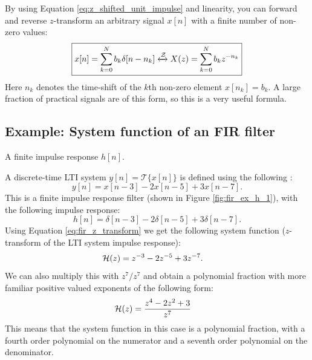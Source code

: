 By using Equation \ref{eq:z_shifted_unit_impulse} and linearity, you
can forward and reverse $z$-transform an arbitrary signal $x[n]$ with a
finite number of non-zero values:
\begin{equation}
  \boxed{
    x[n] = \sum_{k=0}^{N}  b_k \delta[n-n_k] \xleftrightarrow{\mathcal{Z}} X(z) = \sum_{k=0}^{N}  b_k z^{-n_k}
    \label{eq:fir_z_transform}
    }
\end{equation}
Here $n_k$ denotes the time-shift of the $k$th non-zero element
$x[n_k]=b_k$. A large fraction of practical signals are of this form, so this is a very useful formula.

\subsection{Example: System function of an FIR filter}

\begin{marginfigure}
\begin{center}
\end{center}
\caption{A finite impulse response $h[n]$.}
\label{fig:fir_ex_h_1}
\end{marginfigure}

A discrete-time LTI system $y[n]=\mathcal{T}\{x[n]\}$ is defined using the following \emph{}:
\begin{equation}
y[n] = x[n-3] - 2 x[n-5] + 3 x[n-7].
\end{equation}
This is a finite impulse response filter (shown in Figure \ref{fig:fir_ex_h_1}), with the following impulse response:
\begin{equation}
h[n]=\delta[n-3]-2\delta[n-5]+3\delta[n-7].
\end{equation}
Using Equation \ref{eq:fir_z_transform} we get the following system function ($z$-transform of the LTI system impulse response):
\begin{align}
\mathcal{H}(z) &= z^{-3} - 2 z^{-5} + 3 z^{-7}.
\end{align}
We can also multiply this with $z^{7}/z^{7}$ and obtain a polynomial
fraction with more familiar positive valued exponents of the following
form:    
\begin{align}
\mathcal{H}(z) &= \frac{z^{4} - 2 z^{2} + 3}{z^{7}}
\end{align}
This means that the system function in this case is a polynomial
fraction, with a fourth order polynomial on the numerator and a seventh order polynomial on the denominator.

